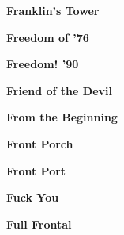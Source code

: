 \newline
\vspace{10pt} 
\begin{center}\textbf{Franklin's Tower}\end{center}
\newline
\vspace{10pt} 
\begin{center}\textbf{Freedom of '76}\end{center}
\newline
\vspace{10pt} 
\begin{center}\textbf{Freedom! '90}\end{center}
\newline
\vspace{10pt} 
\begin{center}\textbf{Friend of the Devil}\end{center}
\newline
\vspace{10pt} 
\begin{center}\textbf{From the Beginning}\end{center}
\newline
\vspace{10pt} 
\begin{center}\textbf{Front Porch}\end{center}
\newline
\vspace{10pt} 
\begin{center}\textbf{Front Port}\end{center}
\newline
\vspace{10pt} 
\begin{center}\textbf{Fuck You}\end{center}
\newline
\vspace{10pt} 
\begin{center}\textbf{Full Frontal}\end{center}
\newline
\vspace{10pt} 
